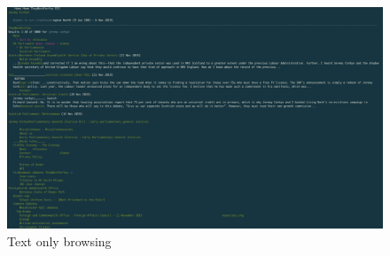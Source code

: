 \begin{figure}[h]
  \centering
  \includegraphics[scale=0.20]{images/they-work-for-you-implementation-text-only-lynx}
  \caption{Text only browsing}
  \label{fig:they-work-for-you-implementation-text-only-lynx}
\end{figure}